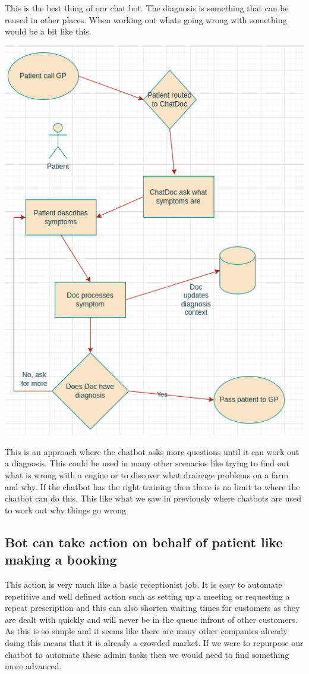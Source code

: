 \documentclass{article}
\begin{document}
This is the best thing of our chat bot. The diagnosis is something that can be reused in other places. 
When working out whats going wrong with something would be a bit like this.
\begin{center} 
\includegraphics[scale=0.5]{PatientFlow}
\end{center}
This is an approach where the chatbot asks more questions until it can work out a diagnosis. 
This could be used in many other scenarios like trying to find out what is wrong with a engine or to discover what drainage problems on a farm and why. If the chatbot has the right training then there is no limit to where the chatbot can do this. This like what we saw in previously where chatbots are used to work out why things go wrong\cite{gyan}\cite{devops}

\subsection{Bot can take action on behalf of patient like making a booking}
This action is very much like a basic receptionist job. It is easy to automate repetitive and well defined action such as setting up a meeting or requesting a repeat prescription and this can also shorten waiting times for customers as they are dealt with quickly and will never be in the queue infront of other customers. As this is so simple and it seems like there are many other companies already doing this means that it is already a crowded market. If we were to repurpose our chatbot to automate these admin tasks then we would need to find something more advanced.
\end{document}
